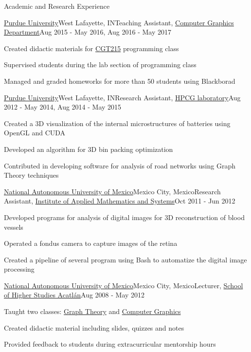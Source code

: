 \documentclass{resume} %
\begin{document}
\begin{rSection}{Academic and Research Experience}

	\begin{rSubsection}{\href{http://www.purdue.edu}{Purdue University}}{West Lafayette, IN}{Teaching Assistant, \href{http://polytechnic.purdue.edu/departments/computer-graphics-technology}{Computer Graphics Department}}{Aug 2015 - May 2016, Aug 2016 - May 2017}
	\item Created didactic materials for \href{https://polytechnic.purdue.edu/sites/default/files/CGT-fall-2017.pdf}{CGT215} programming class
	\item Supervised students during the lab section of programming class
	\item Managed and graded homeworks for more than 50 students using Blackborad
	\end{rSubsection}

	\begin{rSubsection}{\href{http://www.purdue.edu}{Purdue University}}{West Lafayette, IN}{Research Assistant, \href{http://hpcg.purdue.edu/}{HPCG laboratory}}{Aug 2012 - May 2014, Aug 2014 - May 2015}
	\item Created a 3D visualization of the internal microstructures of batteries using OpenGL and CUDA
	\item Developed an algorithm for 3D bin packing optimization
	\item Contributed in developing software for analysis of road networks using Graph Theory techniques
	\end{rSubsection}
	
	\begin{rSubsection}{\href{http://www.unam.mx}{National Autonomous University of Mexico}}{Mexico City, Mexico}{Research Assistant, \href{https://turing.iimas.unam.mx/}{Institute of Applied Mathematics and Systems}}{Oct 2011 - Jun 2012}
	\item Developed programs for analysis of digital images for 3D reconstruction of blood vessels
	\item Operated a fondus camera to capture images of the retina
	\item Created a pipeline of several program using Bash to automatize the digital image processing
	\end{rSubsection}
	
	\begin{rSubsection}{\href{http://www.unam.mx}{National Autonomous University of Mexico}}{Mexico City, Mexico}{Lecturer, \href{https://www.acatlan.unam.mx}{School of Higher Studies Acatl\'{a}n}}{Aug 2008 - May 2012}
	\item Taught two classes: \href{https://www.acatlan.unam.mx/files/PlanesDeEstudio/MAC/4/Teoria_de_Graficas.pdf}{Graph Theory} and \href{https://www.acatlan.unam.mx/files/PlanesDeEstudio/MAC/7/Graficacion_por_Computadora.pdf}{Computer Graphics}
	\item Created didactic material including slides, quizzes and notes
	\item Provided feedback to students during extracurricular mentorship hours
	\end{rSubsection}
	

\end{rSection}
\end{document}
